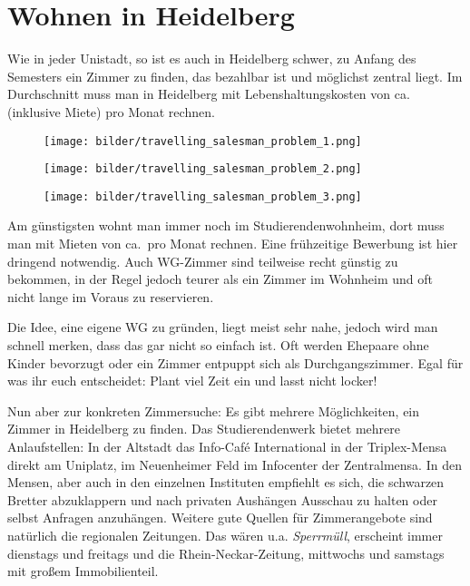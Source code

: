 
\section{Wohnen in Heidelberg}

Wie in jeder Unistadt, so ist es auch in Heidelberg schwer, zu Anfang des Semesters ein Zimmer zu finden, das bezahlbar ist und möglichst zentral liegt. Im Durchschnitt muss man in Heidelberg mit Lebenshaltungskosten von ca. \lebenshaltungskosten (inklusive Miete) pro Monat rechnen.

\begin{figure*}[t]
    \centering
    \begin{subfigure}{.3\textwidth}
    \texttt{[image: bilder/travelling\_salesman\_problem\_1.png]}
    \end{subfigure}
    \begin{subfigure}{.3\textwidth}
    \texttt{[image: bilder/travelling\_salesman\_problem\_2.png]}
    \end{subfigure}
    \begin{subfigure}{.3\textwidth}
    \texttt{[image: bilder/travelling\_salesman\_problem\_3.png]}
    \end{subfigure}
\end{figure*}

Am günstigsten wohnt man immer noch im Studierendenwohnheim, dort muss man mit Mieten von ca.~\studentenwohnheim pro Monat rechnen. Eine frühzeitige Bewerbung ist hier dringend notwendig. Auch WG-Zimmer sind teilweise recht günstig zu bekommen, in der Regel jedoch teurer als ein Zimmer im Wohnheim und oft nicht lange im Voraus zu reservieren.

Die Idee, eine eigene WG zu gründen, liegt meist sehr nahe, jedoch wird man schnell merken, dass das gar nicht so einfach ist. Oft werden Ehepaare ohne Kinder bevorzugt oder ein Zimmer entpuppt sich als Durchgangszimmer. Egal für was ihr euch entscheidet: Plant viel Zeit ein und lasst nicht locker!

Nun aber zur konkreten Zimmersuche: Es gibt mehrere Möglichkeiten, ein Zimmer in Heidelberg zu finden. Das Studierendenwerk bietet mehrere Anlaufstellen: In der Altstadt das Info-Café International in der Triplex-Mensa direkt am Uniplatz, im Neuenheimer Feld im Infocenter der Zentralmensa. In den Mensen, aber auch in den einzelnen Instituten empfiehlt es sich, die schwarzen Bretter abzuklappern und nach privaten Aushängen Ausschau zu halten oder selbst Anfragen anzuhängen. Weitere gute Quellen für Zimmerangebote sind natürlich die regionalen Zeitungen. Das wären u.a. \emph{Sperrmüll}, erscheint immer dienstags und freitags und die Rhein-Neckar-Zeitung, mittwochs und samstags mit großem Immobilienteil. %



